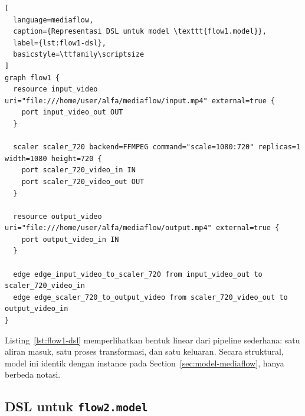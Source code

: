 \begin{lstlisting}[
  language=mediaflow,
  caption={Representasi DSL untuk model \texttt{flow1.model}},
  label={lst:flow1-dsl},
  basicstyle=\ttfamily\scriptsize
]
graph flow1 {
  resource input_video uri="file:///home/user/alfa/mediaflow/input.mp4" external=true {
    port input_video_out OUT
  }

  scaler scaler_720 backend=FFMPEG command="scale=1080:720" replicas=1 width=1080 height=720 {
    port scaler_720_video_in IN
    port scaler_720_video_out OUT
  }

  resource output_video uri="file:///home/user/alfa/mediaflow/output.mp4" external=true {
    port output_video_in IN
  }

  edge edge_input_video_to_scaler_720 from input_video_out to scaler_720_video_in
  edge edge_scaler_720_to_output_video from scaler_720_video_out to output_video_in
}
\end{lstlisting}

Listing~\ref{lst:flow1-dsl} memperlihatkan bentuk linear dari pipeline sederhana: satu aliran masuk, satu proses transformasi, dan satu keluaran. Secara struktural, model ini identik dengan instance pada Section~\ref{sec:model-mediaflow}, hanya berbeda notasi.

\subsection{DSL untuk \texttt{flow2.model}}

